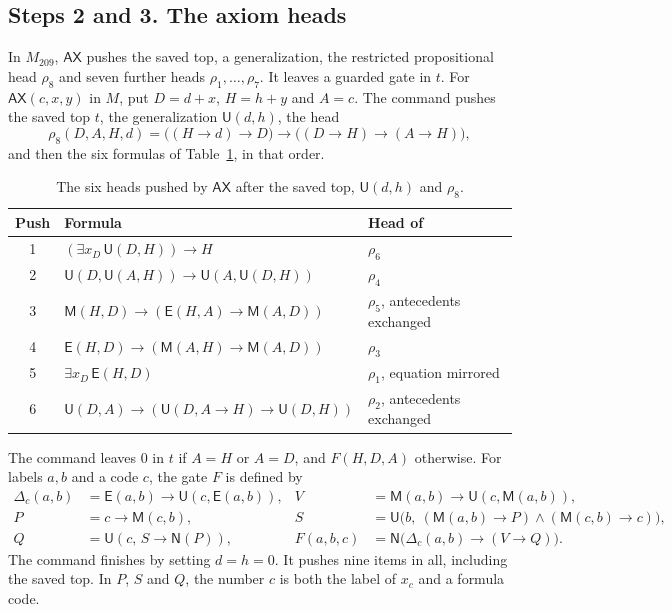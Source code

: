 \documentclass[11pt,letterpaper]{article}
\newcommand{\ax}{\mathsf{AX}}
\newcommand{\Mc}{\mathsf{M}}
\newcommand{\Uc}{\mathsf{U}}
\newcommand{\Ec}{\mathsf{E}}
\newcommand{\Nc}{\mathsf{N}}
\begin{document}
\subsection{Steps 2 and 3. The axiom heads}

In $M_{209}$, $\ax$ pushes the saved top, a generalization, the
restricted propositional head $\rho_8$ and seven further heads
$\rho_1,\ldots,\rho_7$. It leaves a guarded gate in $t$.
For $\ax(c,x,y)$ in $M$, put $D=d+x$, $H=h+y$ and $A=c$. The command
pushes the saved top $t$, the generalization $\Uc(d,h)$, the head
\[
 \rho_8(D,A,H,d)=\bigl((H\to d)\to D\bigr)\to\bigl((D\to H)\to(A\to H)\bigr),
\]
and then the six formulas of Table~\ref{tab:heads}, in that order.

\begin{table}[ht]
\centering\small
\begin{tabular}{@{}cll@{}}
\toprule
Push & Formula & Head of~\cite{pa209} \\
\midrule
1 & $(\exists x_D\,\Uc(D,H))\to H$ & $\rho_6$ \\
2 & $\Uc(D,\Uc(A,H))\to\Uc(A,\Uc(D,H))$ & $\rho_4$ \\
3 & $\Mc(H,D)\to(\Ec(H,A)\to\Mc(A,D))$ & $\rho_5$, antecedents exchanged \\
4 & $\Ec(H,D)\to(\Mc(A,H)\to\Mc(A,D))$ & $\rho_3$ \\
5 & $\exists x_D\,\Ec(H,D)$ & $\rho_1$, equation mirrored \\
6 & $\Uc(D,A)\to(\Uc(D,A\to H)\to\Uc(D,H))$ & $\rho_2$, antecedents exchanged \\
\bottomrule
\end{tabular}
\caption{The six heads pushed by $\ax$ after the saved top,
$\Uc(d,h)$ and $\rho_8$.}\label{tab:heads}
\end{table}

The command leaves $0$ in $t$ if $A=H$ or $A=D$, and $F(H,D,A)$
otherwise. For labels $a,b$ and a code $c$, the gate $F$ is defined by
\begin{align*}
 \Delta_c(a,b)&=\Ec(a,b)\to\Uc(c,\Ec(a,b)), &
 V&=\Mc(a,b)\to\Uc(c,\Mc(a,b)),\\
 P&=c\to\Mc(c,b), &
 S&=\Uc\bigl(b,\ (\Mc(a,b)\to P)\wedge(\Mc(c,b)\to c)\bigr),\\
 Q&=\Uc(c,\,S\to\Nc(P)), &
 F(a,b,c)&=\Nc\bigl(\Delta_c(a,b)\to(V\to Q)\bigr).
\end{align*}
The command finishes by setting $d=h=0$. It pushes nine items in all,
including the saved top. In $P$, $S$ and $Q$, the number $c$ is both
the label of $x_c$ and a formula code.
\end{document}
